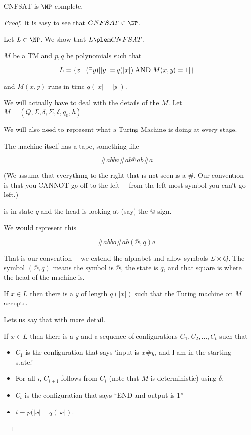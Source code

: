 \documentclass[12pt]{article}
\begin{document}
\begin{theorem}
CNFSAT is $\NP$-complete.
\end{theorem}

\begin{proof}
It is easy to see that $CNFSAT \in \NP$.

Let $L\in\NP$. We show that $L\plem CNFSAT$.

$M$ be a TM and $p,q$ be polynomials such that

$$L= \{ x \mid (\exists y)[|y|=q(|x|) \hbox{ AND } M(x,y)=1]\}$$

and $M(x,y)$ runs in time $q(|x|+|y|)$.

We will actually have to deal
with the details of the $M$. Let $M=(Q,\Sigma,\delta,\Sigma,\delta,q_0,h)$

We will also need to represent what a Turing Machine is doing at every stage.

The machine itself has a tape, something like

$$\# a b b a \# a b @ a b \# a$$

(We assume that everything to the right that is not seen is a $\#$.
Our convention is that you CANNOT go off to the left--- from the left
most symbol you can't go left.)

is in state $q$ and the head is looking at (say) the $@$ sign.

We would represent this

$$\# a b b a \# a b (@,q) a $$

That is our convention--- we extend the alphabet and allow symbols $\Sigma\times Q$.
The symbol $(@,q)$ means
the symbol is $@$, the state is $q$, and that square is where the head of
the machine is.

If $x\in L$ then there is a $y$ of length $q(|x|)$ such that 
the Turing machine on $M$ accepts.

Lets us say that with more detail.

If $x\in L$ then there is a $y$ and a sequence of configurations
$C_1, C_2, \ldots, C_t$ such that

\begin{itemize}
\item
$C_1$ is the configuration that says
`input is $x\#y$, and I am in the starting state.'
\item
For all $i$, $C_{i+1}$ follows from $C_i$ (note that $M$ is deterministic)
using $\delta$.
\item
$C_t$ is the configuration that says ``END and output is 1''
\item
$t= p(|x|+q(|x|)$.
\end{itemize}


\end{proof}
\end{document}
